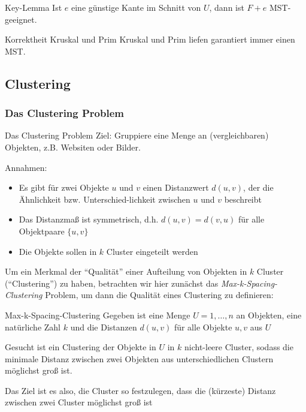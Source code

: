 \documentclass{panikzettel}
\begin{document}
{\begin{defi}{Key-Lemma}
	Ist $e$ eine günstige Kante im Schnitt von $U$, dann ist $F+e$ MST-geeignet.
\end{defi}


\begin{theo}{Korrektheit Kruskal und Prim}
	Kruskal und Prim liefen garantiert immer einen MST.
\end{theo}

\subsection{Clustering}

\subsubsection{Das Clustering Problem}

\begin{defi}{Das Clustering Problem}
	Ziel: Gruppiere eine Menge an (vergleichbaren) Objekten, z.B. Websiten oder Bilder.
	
	Annahmen:
	\begin{itemize}
		\item Es gibt für zwei Objekte $u$ und $v$ einen Distanzwert $d(u,v)$, der die Ähnlichkeit bzw. Unterschied-lichkeit zwischen $u$ und $v$ beschreibt
		\item Das Distanzmaß ist symmetrisch, d.h. $d(u,v) = d(v,u)$ für alle Objektpaare $\{u,v\}$
		\item Die Objekte sollen in $k$ Cluster eingeteilt werden
	\end{itemize}
\end{defi}

Um ein Merkmal der ``Qualität'' einer Aufteilung von Objekten in $k$ Cluster (``Clustering'') zu haben, betrachten wir hier zunächst das \emph{Max-k-Spacing-Clustering} Problem, um dann die Qualität eines Clustering zu definieren:

\begin{defi}{Max-k-Spacing-Clustering}
	Gegeben ist eine Menge $U = 1,\dots, n$ an Objekten, eine natürliche Zahl $k$ und die Distanzen $d(u,v)$ für alle Objekte $u,v$ aus $U$
	
	Gesucht ist ein Clustering der Objekte in $U$ in $k$ nicht-leere Cluster, sodass die minimale Distanz zwischen zwei Objekten aus unterschiedlichen Clustern möglichst groß ist. 
	
	Das Ziel ist es also, die Cluster so festzulegen, dass die (kürzeste) Distanz zwischen zwei Cluster möglichst groß ist
\end{defi}

}
\end{document}
